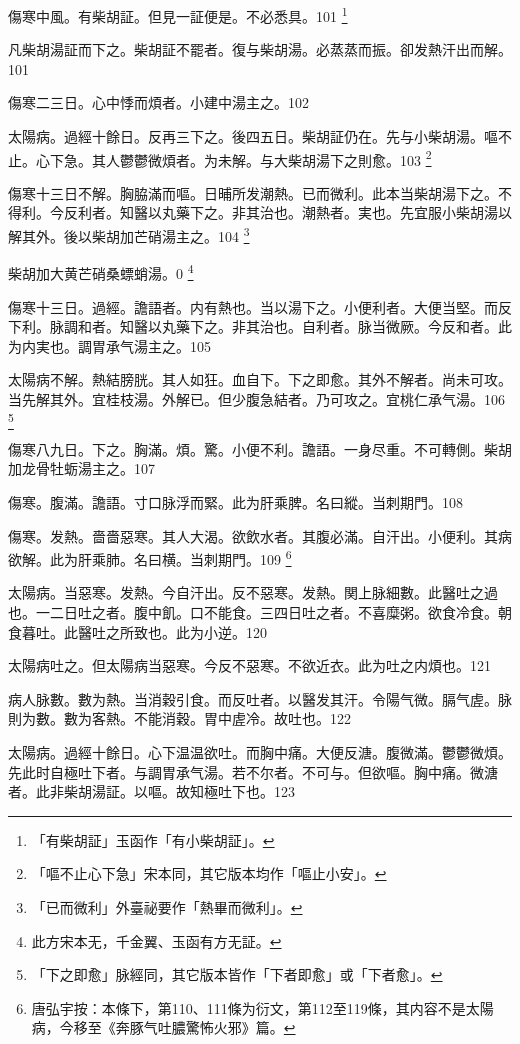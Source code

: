 傷寒中風。有柴胡証。但見一証便是。不必悉具。101
	\footnote{「有柴胡証」玉函作「有小柴胡証」。}

凡柴胡湯証而下之。柴胡証不罷者。復与柴胡湯。必蒸蒸而振。卻发熱汗出而解。101

傷寒二三日。心中悸而煩者。小建中湯主之。102

太陽病。過經十餘日。反再三下之。後四五日。柴胡証仍在。先与小柴胡湯。嘔不止。心下急。其人鬱鬱微煩者。为未解。与大柴胡湯下之則愈。103
	\footnote{「嘔不止心下急」宋本同，其它版本均作「嘔止小安」。}

傷寒十三日不解。胸脇滿而嘔。日晡所发潮熱{\khaaitp 。已}而微利。此本当柴胡湯下之。不得利。今反利者。知醫以丸藥下之。非其治也。潮熱者。実也。先宜服小柴胡湯以解其外。後以柴胡加芒硝湯主之。104
	\footnote{「已而微利」外臺祕要作「熱畢而微利」。}

柴胡加大黄芒硝桑螵蛸湯。0
	\footnote{此方宋本无，千金翼、玉函有方无証。}

傷寒十三日。過經。譫語者。内有熱也。当以湯下之。小便利者。大便当堅。而反{\khaaitp 下}利。脉調和者。知醫以丸藥下之。非其治也。自利者。脉当微厥。今反和者。此为内実也。{\khaaitp 調胃}承气湯主之。105

太陽病不解。熱結膀胱。其人如狂。血自下。下之即愈。其外不解者。尚未可攻。当先解其外。{\khaaitp 宜桂枝湯。}外解已。{\khaaitp 但}少腹急結者。乃可攻之。宜桃仁承气湯。106
	\footnote{「下之即愈」脉經同，其它版本皆作「下者即愈」或「下者愈」。}

傷寒八九日。下之。胸滿。煩。驚。小便不利。譫語。一身尽重。不可轉側。柴胡加龙骨牡蛎湯主之。107

傷寒。腹滿。譫語。寸口脉浮而緊。此为肝乘脾。名曰縱。当刺期門。108

傷寒。发熱。嗇嗇惡寒。其人大渴。欲飲水者。其腹必滿。自汗出。小便利。其病欲解。此为肝乘肺。名曰横。当刺期門。109
	\footnote{唐弘宇按：本條下，第110、111條为衍文，第112至119條，其内容不是太陽病，今移至《奔豚气吐膿驚怖火邪》篇。}

太陽病。当惡寒。发熱。今自汗出。反不惡寒。发熱。関上脉細數。此醫吐之過也。一二日吐之者。腹中飢。口不能食。三四日吐之者。不喜糜粥。欲食冷食。朝食暮吐。此醫吐之所致也。此为小逆。120

太陽病吐之。但太陽病当惡寒。今反不惡寒。不欲近衣。此为吐之内煩也。121

病人脉數。數为熱。当消穀引食。而反吐者。以醫发其汗。令陽气微。膈气虗。脉則为數。數为客熱。不能消穀。胃中虗冷。故吐也。122

太陽病。過經十餘日。心下温温欲吐。而胸中痛。大便反溏。腹微滿。鬱鬱微煩。先{\khaaitp 此}时自極吐下者。与{\khaaitp 調胃}承气湯。若不尔者。不可与。但欲嘔。胸中痛。微溏者。此非柴胡湯証。以嘔。故知極吐下也。123

